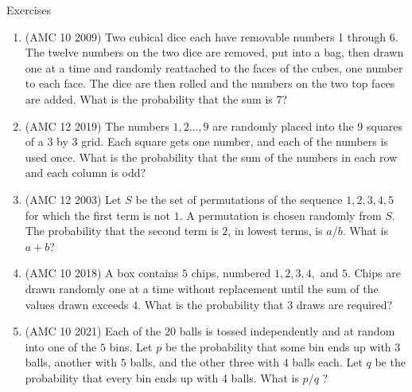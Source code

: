 \begin{xcb}{Exercises}
\begin{enumerate}
\begin{hint}
\end{hint}
\item (AMC 10 2009)  Two cubical dice each have removable numbers 1 through 6. The twelve numbers on the two dice are removed, put into a bag, then drawn one at a time and randomly reattached to the faces of the cubes, one number to each face. The dice are then rolled and the numbers on the two top faces are added. What is the probability that the sum is 7?
\begin{hint}
\end{hint}
\item (AMC 12 2019)  The numbers $1,2 \dots ,9$ are randomly placed into the 9 squares of a 3 by 3 grid. Each square gets one number, and each of the numbers is used once. What is the probability that the sum of the numbers in each row and each column is odd?\par
\begin{hint}
\end{hint}
\item (AMC 12 2003)  Let $S$ be the set of permutations of the sequence $1, 2, 3, 4, 5$ for which the first term is not $1$. A permutation is chosen randomly from $S$. The probability that the second term is $2$, in lowest terms, is $a/b$. What is $a + b$?
\item (AMC 10 2018)  A box contains $5$ chips, numbered $1, 2, 3, 4,$ and $5$. Chips are drawn randomly one at a time without replacement until the sum of the values drawn exceeds $4$. What is the probability that $3$ draws are required?
\begin{hint}
\end{hint}
\item (AMC 10 2021)  Each of the $20$ balls is tossed independently and at random into one of the $5$ bins. Let $p$ be the probability that some bin ends up with $3$ balls, another with $5$ balls, and the other three with $4$ balls each. Let $q$ be the probability that every bin ends up with 4 balls. What is $p/q$ ?

\end{enumerate}
\end{xcb}
